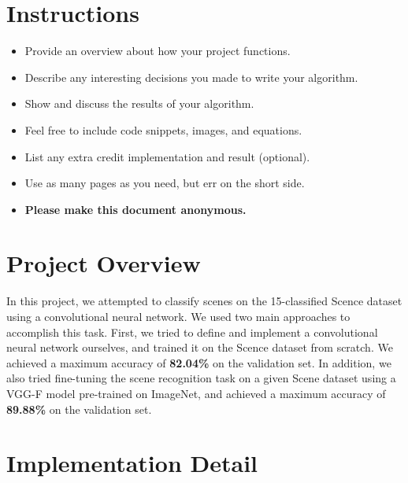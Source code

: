 \section*{Instructions}
\begin{itemize}
  \item Provide an overview about how your project functions. 
  \item Describe any interesting decisions you made to write your algorithm.
  \item Show and discuss the results of your algorithm.
  \item Feel free to include code snippets, images, and equations.
  \item List any extra credit implementation and result (optional).
  \item Use as many pages as you need, but err on the short side.
  \item \textbf{Please make this document anonymous.}
\end{itemize}

\section*{Project Overview}

In this project, we attempted to classify scenes on the 15-classified Scence dataset using a convolutional neural network. We used two main approaches to accomplish this task. First, we tried to define and implement a convolutional neural network ourselves, and trained it on the Scence dataset from scratch. We achieved a maximum accuracy of \textbf{82.04\%} on the validation set. In addition, we also tried fine-tuning the scene recognition task on a given Scene dataset using a VGG-F model pre-trained on ImageNet, and achieved a maximum accuracy of \textbf{89.88\%} on the validation set.

\section*{Implementation Detail}

